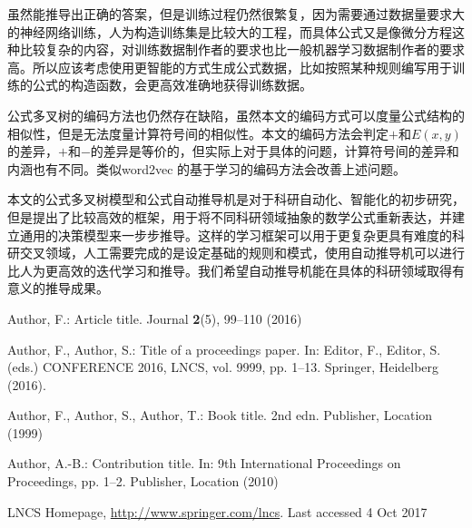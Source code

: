 \documentclass[runningheads]{llncs}
\begin{document}
虽然能推导出正确的答案，但是训练过程仍然很繁复，因为需要通过数据量要求大的神经网络训练，人为构造训练集是比较大的工程，而具体公式又是像微分方程这种比较复杂的内容，对训练数据制作者的要求也比一般机器学习数据制作者的要求高。所以应该考虑使用更智能的方式生成公式数据，比如按照某种规则编写用于训练的公式的构造函数，会更高效准确地获得训练数据。

公式多叉树的编码方法也仍然存在缺陷，虽然本文的编码方式可以度量公式结构的相似性，但是无法度量计算符号间的相似性。本文的编码方法会判定$+$和$E(x,y)$的差异，$+$和$-$的差异是等价的，但实际上对于具体的问题，计算符号间的差异和内涵也有不同。类似word2vec \cite{ref_url1}的基于学习的编码方法会改善上述问题。

本文的公式多叉树模型和公式自动推导机是对于科研自动化、智能化的初步研究，但是提出了比较高效的框架，用于将不同科研领域抽象的数学公式重新表达，并建立通用的决策模型来一步步推导。这样的学习框架可以用于更复杂更具有难度的科研交叉领域，人工需要完成的是设定基础的规则和模式，使用自动推导机可以进行比人为更高效的迭代学习和推导。我们希望自动推导机能在具体的科研领域取得有意义的推导成果。










%
%




\begin{thebibliography}{8}
Author, F.: Article title. Journal \textbf{2}(5), 99--110 (2016)

Author, F., Author, S.: Title of a proceedings paper. In: Editor,
F., Editor, S. (eds.) CONFERENCE 2016, LNCS, vol. 9999, pp. 1--13.
Springer, Heidelberg (2016). 

Author, F., Author, S., Author, T.: Book title. 2nd edn. Publisher,
Location (1999)

Author, A.-B.: Contribution title. In: 9th International Proceedings
on Proceedings, pp. 1--2. Publisher, Location (2010)

LNCS Homepage, \url{http://www.springer.com/lncs}. Last accessed 4
Oct 2017

\end{thebibliography}


% 
% 
\end{document}
